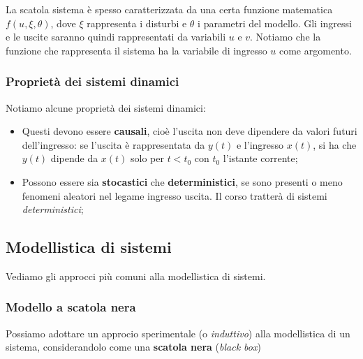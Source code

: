 \documentclass[a4paper,11pt]{article}
\begin{document}
La scatola sistema è spesso caratterizzata da una certa funzione matematica $f(u, \xi, \theta)$, dove $\xi$ rappresenta i disturbi e $\theta$ i parametri del modello.
Gli ingressi e le uscite saranno quindi rappresentati da variabili $u$ e $v$. 
Notiamo che la funzione che rappresenta il sistema ha la variabile di ingresso $u$ come argomento.

\begin{center}
\end{center}

\subsubsection{Proprietà dei sistemi dinamici}
Notiamo alcune proprietà dei sistemi dinamici:
\begin{itemize}
	\item Questi devono essere \textbf{causali}, cioè l'uscita non deve dipendere da valori futuri dell'ingresso: se l'uscita è rappresentata da $y(t)$ e l'ingresso $x(t)$, si ha che $y(t)$ dipende da $x(t)$ solo per $t < t_0$ con $t_0$ l'istante corrente;
	\item Possono essere sia \textbf{stocastici} che \textbf{deterministici}, se sono presenti o meno fenomeni aleatori nel legame ingresso uscita. Il corso tratterà di sistemi \textit{deterministici};
\end{itemize}

\subsection{Modellistica di sistemi}
Vediamo gli approcci più comuni alla modellistica di sistemi.

\subsubsection{Modello a scatola nera}
Possiamo adottare un approcio sperimentale (o \textit{induttivo}) alla modellistica di un sistema, considerandolo come una \textbf{scatola nera} (\textit{black box}) 
\end{document}
